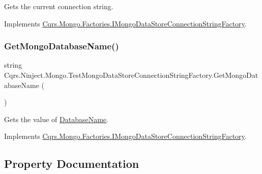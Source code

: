 Gets the current connection string. 



Implements \hyperlink{interfaceCqrs_1_1Mongo_1_1Factories_1_1IMongoDataStoreConnectionStringFactory_ad8ea94d071ebedf6b137a0b99c2cc12c_ad8ea94d071ebedf6b137a0b99c2cc12c}{Cqrs.\+Mongo.\+Factories.\+I\+Mongo\+Data\+Store\+Connection\+String\+Factory}.

\mbox{\label{classCqrs_1_1Ninject_1_1Mongo_1_1TestMongoDataStoreConnectionStringFactory_ac638a5771711c1d0746ee0ec55c5e192_ac638a5771711c1d0746ee0ec55c5e192}} 
\subsubsection{\texorpdfstring{Get\+Mongo\+Database\+Name()}{GetMongoDatabaseName()}}
{\footnotesize\ttfamily string Cqrs.\+Ninject.\+Mongo.\+Test\+Mongo\+Data\+Store\+Connection\+String\+Factory.\+Get\+Mongo\+Database\+Name (\begin{DoxyParamCaption}{ }\end{DoxyParamCaption})}



Gets the value of \hyperlink{classCqrs_1_1Ninject_1_1Mongo_1_1TestMongoDataStoreConnectionStringFactory_a911d570725e6702a9c1d16321202d89f_a911d570725e6702a9c1d16321202d89f}{Database\+Name}. 



Implements \hyperlink{interfaceCqrs_1_1Mongo_1_1Factories_1_1IMongoDataStoreConnectionStringFactory_a90de27c2bf23d7f9412d55c09ab2ec8c_a90de27c2bf23d7f9412d55c09ab2ec8c}{Cqrs.\+Mongo.\+Factories.\+I\+Mongo\+Data\+Store\+Connection\+String\+Factory}.



\subsection{Property Documentation}
\mbox{\label{classCqrs_1_1Ninject_1_1Mongo_1_1TestMongoDataStoreConnectionStringFactory_a911d570725e6702a9c1d16321202d89f_a911d570725e6702a9c1d16321202d89f}} 
